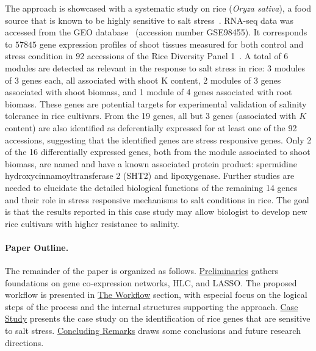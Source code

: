 \documentclass{bmcart}
\begin{document}
The approach is showcased with a systematic study on rice
(\textit{Oryza sativa}), a food source that is known to be
highly sensitive to salt stress~\cite{chang2019morphological}. RNA-seq
data was accessed from the GEO database~\cite{clough2016gene}
(accession number GSE98455). It corresponds to $57845$ gene expression
profiles of shoot tissues measured for both control and stress condition
in $92$ accessions of the Rice Diversity Panel 1~\cite{eizenga2014registration}. A total of 6 modules
are detected as relevant in the response to salt stress in rice: 3
modules of 3 genes each, all associated with shoot K content, 2
modules of 3 genes associated with shoot biomass, and 1 module of 4
genes associated with root biomass. These genes are potential
targets for experimental validation of salinity tolerance in rice
cultivars. From the 19 genes, all but 3 genes (associated with $K$
content) are also identified as deferentially expressed for at least
one of the 92 accessions, suggesting that the identified genes are
stress responsive genes. Only 2 of the 16 differentially
expressed genes, both from the module associated to shoot biomass, are
named and have a known associated protein product: spermidine
hydroxycinnamoyltransferase 2 (SHT2) and lipoxygenase. 
Further studies are needed to elucidate the detailed biological
functions of the remaining 14 genes and their role
in stress responsive mechanisms
to salt conditions in rice. The goal is that the results reported in
this case study may allow biologist to develop new rice cultivars with
higher resistance to salinity.

\paragraph{Paper Outline.}

The remainder of the paper is organized as
follows. \hyperref[sec.prelim]{Preliminaries} gathers foundations on gene
co-expression networks, HLC, and LASSO. The proposed workflow is
presented in \hyperref[sec.framework]{The Workflow} section, with especial focus on the
logical steps of the process and the internal structures supporting
the approach. \hyperref[sec.case]{Case Study} presents the case study on the
identification of rice genes that are sensitive to salt
stress. \hyperref[sec.concl]{Concluding Remarks} draws some conclusions and future research directions.
\end{document}
